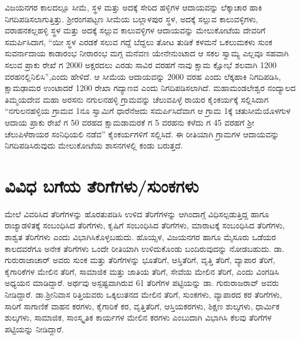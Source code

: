 ವಿಜಯನಗರ ಕಾಲದಲ್ಲೂ ಸೀಮೆ, ಸ್ಥಳ ಮತ್ತು ಅದಕ್ಕೆ ಸೇರಿದ ಹಳ್ಳಿಗಳ ಆದಾಯವನ್ನು ಲೆಕ್ಕಾಚಾರ ಹಾಕಿ ನಿಗದಿಪಡಿಸಲಾಗುತ್ತಿತ್ತು. ಶ‍್ರೀರಂಗಪಟ್ಟಣ ಸೀಮೆಯ ಬಲ್ಲಾಳಪುರ ಸ್ಥಳ, ಅದಕ್ಕೆ ಸಲ್ಲುವ ಕಾಲುವಳ್ಳಿಗಳು, ವರಾಹನಕಲ್ಲಹಳ್ಳಿ ಸ್ಥಳ ಮತ್ತು ಅದಕ್ಕೆ ಸಲ್ಲುವ ಕಾಲುವಳ್ಳಿಗಳ ಆದಾಯವನ್ನು ಮೇಲುಕೋಟೆಯ ದೇವರಿಗೆ ಸಮರ್ಪಿಸಿದಾಗ, “ಯೀ ಸ್ಥಳ ಎರಡಕೆ ಸಲುವ ಗದ್ದೆ ಬೆದ್ದಲು ತೋಟ ತುಡಿಕೆ ಕಳಮನೆ ಒಕಲುಮಕಳು ಸುಂಕ ಸುವರ್ನಾದಾಯ ಕಾಡಾರಂಭ ನೀರಾರಂಭ ಮಗ್ಗ ಮನೆವಣ ಯೇನೇನುಂಟಾದ ಆ ಸಕಲ ಸ್ವಾಮ್ಯ ಎಲ್ಲವೂ ಸಹವಾಗಿ ಸಲುವ ಪ್ರಾಕು ರೇಖೆ ಗ 2000 ಅಕ್ಷರದಲು ಎರಡು ಸಾವಿರ ವರಹಗೆ ನಾವು ಕ್ಷಾಮ ಕ್ಷೋಭೆ ಶಲವಾಗಿ 1200 ವರಹನಲ್ಲಿನಿಲಿಸಿ”,ಎಂದು ಹೇಳಿದೆ. ಆ ಸೀಮೆಯ ಆದಾಯವನ್ನು 2000 ವರಹ ಎಂದು ಲೆಕ್ಕಹಾಕಿ ನಿಗದಿಪಡಿಸಿ, ಕ್ಷಾಮಢಾಮರ ಉಂಟಾದರೆ 1200 ರೇಖಾ ಗದ್ಯಾಣವ ಎಂದು ನಿಗದಿಪಡಿಸಲಾಗಿದೆ. ಮಹಾಮಂಡಲೇಶ್ವರ ನಂದ್ಯಾಲದ ತಿಮ್ಮಯದೇವ ಮಹಾ ಅರಸನು ನಗುಲನಹಳ್ಳಿ ಗ್ರಾಮವನ್ನು ಚೆಲುವಪಿಳ್ಳೆ ರಾಯರ ಕೈಂಕರ್ಯಕ್ಕೆ ಸಲ್ಲಿಸಿದಾಗ “ನಗುಲನಹಳ್ಳಿಯ ಗ್ರಾಮವ 1ನೂ ಸ್ವಾಮಿಗೆ ಧಾರೆನೆಱದು ಸಮರ್ಪಿಸಿದೆವಾಗ ಆ ಗ್ರಾಮ 1ಕ್ಕೆ ಚತುಸೀಮೆಯೊಳಗುಳ ಆದಾಯ ಪ್ರಾಕು ರೇಖೆ ಗ 50 ವರಹದ ಕ್ಷಾಮಡಾಮರಕೆ ಗ 5 ವರಹನು ಕಳೆದು ಗ 45 ವರಹಗೆ ಶ‍್ರೀ ಚೆಲುಪಿಳೆರಾಯರ ಸಂನಿಧಿಯಲಿ ನಡೆವ” ಕೈಂಕರ್ಯಗಳಿಗೆ ಸಲ್ಲಿಸಿದೆ. ಈ ರೀತಿಯಾಗಿ ಗ್ರಾಮಗಳ ಆದಾಯವನ್ನು ನಿಗದಿಪಡಿಸಿರುವುದು ಮೇಲುಕೋಟೆಯ ಶಾಸನಗಳಲ್ಲಿ ಕಂಡು ಬರುತ್ತದೆ.


\section{ವಿವಿಧ ಬಗೆಯ ತೆರಿಗೆಗಳು/ಸುಂಕಗಳು}

ಮೇಲೆ ವಿವರಿಸಿದ ತೆರಿಗೆಗಳನ್ನು ಹೊರತುಪಡಿಸಿ ಉಳಿದ ತೆರಿಗೆಗಳನ್ನು ಆಗಿಂದಾಗ್ಗೆ ವಿಧಿಸಲ್ಪಡುತ್ತಿದ್ದ ಹಾಗೂ ರಾಜ್ಯಾಡಳಿತಕ್ಕೆ ಸಂಬಂಧಿಸಿದ ತೆರಿಗೆಗಳು, ಕೃಷಿಗೆ ಸಂಬಂಧಿಸಿದ ತೆರಿಗೆಗಳು, ಮಾರಾಟಕ್ಕೆ ಸಂಬಂಧಿಸಿದ ತೆರಿಗೆಗಳು, ಶಾಶ್ವತ ತೆರಿಗೆಗಳು ಎಂದು ವಿಭಾಗಿಸಿಕೊಳ್ಳಬಹುದು. ಹೊಯ್ಸಳ, ವಿಜಯನಗರ ಹಾಗೂ ಮೈಸೂರು ಒಡೆಯರ ಕಾಲದವರೆಗೂ ಅನೇಕ ತೆರಿಗೆಗಳು ಒಂದೇ ರೀತಿಯಾಗಿ ಉಳಿದುಕೊಂಡು ಬಂದಿರುವುದನ್ನು ನೋಡಬಹುದು. ಡಾ. ಗುರುರಾಜಾಚಾರ್​ ಅವರು ಸುಂಕ ಮತ್ತು ತೆರಿಗೆಗಳನ್ನು ಭೂತೆರಿಗೆ, ಆಸ್ತಿತೆರಿಗೆ, ವೃತ್ತಿ ತೆರಿಗೆ, ವ್ಯಾಪಾರ ತೆರಿಗೆ, ಕೈಗಾರಿಕೆಗಳ ಮೇಲಿನ ತೆರಿಗೆ, ಸಾಮಾಜಿಕ ಮತ್ತು ಜಾತಿಯ ತೆರಿಗೆ, ಸೇವೆಯ ಮೇಲಿನ ತೆರಿಗೆ, ಎಂದು ವಿಂಗಡಿಸಿ ಅಧ್ಯಯನ ಮಾಡಿದ್ದಾರೆ. ಅರ್ಥವು ಅಸ್ಪಷ್ಟವಾಗಿರುವ 61 ತೆರಿಗೆಗಳ ಪಟ್ಟಿಯನ್ನು ಡಾ. ಗುರುರಾಜರಾವ್​ ಅವರು ನೀಡಿದ್ದಾರೆ. ಡಾ.ಶ‍್ರೀನಿವಾಸ ರಿತ್ತಿಯವರು ಒಕ್ಕಲುತನದ ಮೇಲಿನ ತೆರಿಗೆ, ಸುಂಕಗಳು, ವ್ಯಾಪಾರದ ಕರ ತೆರಿಗೆಗಳು, ಸಾರಿಗೆ ಸಾಗಾಣಿಕೆ ವಾಹನ ಕರಗಳು, ಕೈಗಾರಿಕೆ ಕರ, ವೃತ್ತಿತೆರಿಗೆ, ಆಸ್ತಿಯಕರಗಳು, ಶಿಕ್ಷಣ ಶುಲ್ಕಗಳು, ಧಾರ್ಮಿಕ ಶುಲ್ಕಗಳು, ಸಾಮಾಜಿಕ, ಸಾಂಸ್ಕೃತಿಕ ಕಾರ್ಯಗಳ ಮೇಲಿನ ಕರಗಳು ಎಂಬುದಾಗಿ ವಿಭಾಗಿಸಿ ಕೆಲವು ತೆರಿಗೆಗಳ ಪಟ್ಟಿಯನ್ನು ನೀಡಿದ್ದಾರೆ.


